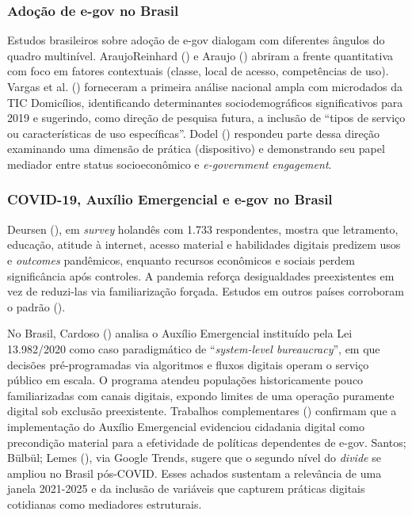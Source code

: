 \documentclass[
  man,
  floatsintext,
  longtable,
  a4paper,
  nolmodern,
  notxfonts,
  notimes,
  colorlinks=true,linkcolor=blue,citecolor=blue,urlcolor=blue]{apa7}
\begin{document}
\subsubsection{Adoção de e-gov no
Brasil}\label{adouxe7uxe3o-de-e-gov-no-brasil}

Estudos brasileiros sobre adoção de e-gov dialogam com diferentes
ângulos do quadro multinível. AraujoReinhard
() e Araujo
() abriram a frente quantitativa
com foco em fatores contextuais (classe, local de acesso, competências
de uso). Vargas et al. () forneceram a
primeira análise nacional ampla com microdados da TIC Domicílios,
identificando determinantes sociodemográficos significativos para 2019 e
sugerindo, como direção de pesquisa futura, a inclusão de ``tipos de
serviço ou características de uso específicas''. Dodel
() respondeu parte dessa direção
examinando uma dimensão de prática (dispositivo) e demonstrando seu
papel mediador entre status socioeconômico e \emph{e-government
engagement}.

\subsubsection{COVID-19, Auxílio Emergencial e e-gov no
Brasil}\label{covid-19-auxuxedlio-emergencial-e-e-gov-no-brasil}

Deursen (), em \emph{survey}
holandês com 1.733 respondentes, mostra que letramento, educação,
atitude à internet, acesso material e habilidades digitais predizem usos
e \emph{outcomes} pandêmicos, enquanto recursos econômicos e sociais
perdem significância após controles. A pandemia reforça desigualdades
preexistentes em vez de reduzi-las via familiarização forçada. Estudos
em outros países corroboram o padrão
().

No Brasil, Cardoso () analisa o
Auxílio Emergencial instituído pela Lei 13.982/2020 como caso
paradigmático de ``\emph{system-level bureaucracy}'', em que decisões
pré-programadas via algoritmos e fluxos digitais operam o serviço
público em escala. O programa atendeu populações historicamente pouco
familiarizadas com canais digitais, expondo limites de uma operação
puramente digital sob exclusão preexistente. Trabalhos complementares
() confirmam que a
implementação do Auxílio Emergencial evidenciou cidadania digital como
precondição material para a efetividade de políticas dependentes de
e-gov. Santos; Bülbül; Lemes
(), via Google Trends, sugere
que o segundo nível do \emph{divide} se ampliou no Brasil pós-COVID.
Esses achados sustentam a relevância de uma janela 2021-2025 e da
inclusão de variáveis que capturem práticas digitais cotidianas como
mediadores estruturais.
\end{document}

